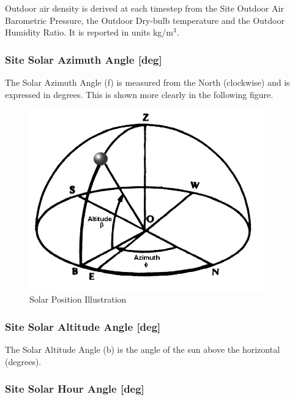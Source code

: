 Outdoor air density is derived at each timestep from the Site Outdoor Air Barometric Pressure, the Outdoor Dry-bulb temperature and the Outdoor Humidity Ratio. It is reported in units kg/m$^3$.

\subsubsection{Site Solar Azimuth Angle {[}deg{]}}\label{site-solar-azimuth-angle-deg}

The Solar Azimuth Angle (f) is measured from the North (clockwise) and is expressed in degrees. This is shown more clearly in the following figure.

\begin{figure}[hbtp] %
\centering
\includegraphics[width=0.9\textwidth, height=0.9\textheight, keepaspectratio=true]{media/image020.png}
\caption{Solar Position Illustration \protect \label{fig:solar-position-illustration}}
\end{figure}

\subsubsection{Site Solar Altitude Angle {[}deg{]}}\label{site-solar-altitude-angle-deg}

The Solar Altitude Angle (b) is the angle of the sun above the horizontal (degrees).

\subsubsection{Site Solar Hour Angle {[}deg{]}}\label{site-solar-hour-angle-deg}

